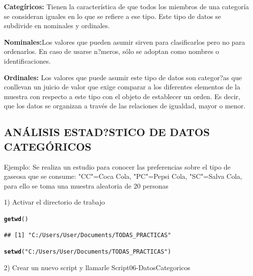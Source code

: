 \documentclass[12pt,letterpaper]{article}\usepackage[]{graphicx}\usepackage[]{color}
\makeatletter
\newcommand{\hlstr}[1]{\textcolor[rgb]{0.192,0.494,0.8}{#1}}%
\newcommand{\hlstd}[1]{\textcolor[rgb]{0.345,0.345,0.345}{#1}}%
\newcommand{\hlkwd}[1]{\textcolor[rgb]{0.737,0.353,0.396}{\textbf{#1}}}%
\newenvironment{kframe}{%
 \def\at@end@of@kframe{}%
 \ifinner\ifhmode%
  \def\at@end@of@kframe{\end{minipage}}%
  \begin{minipage}{\columnwidth}%
 \fi\fi%
 \def\FrameCommand##1{\hskip\@totalleftmargin \hskip-\fboxsep
 \colorbox{shadecolor}{##1}\hskip-\fboxsep
     \hskip-\linewidth \hskip-\@totalleftmargin \hskip\columnwidth}%
 \MakeFramed {\advance\hsize-\width
   \@totalleftmargin\z@ \linewidth\hsize
   \@setminipage}}%
 {\par\unskip\endMakeFramed%
 \at@end@of@kframe}
\newenvironment{knitrout}{}{} %
\makeatother
\begin{document}
\textbf{Categ\'iricos:} Tienen la caracter\'istica de que todos los miembros de una categor\'ia se consideran
iguales en lo que se refiere a ese tipo. Este tipo de datos se subdivide en nominales y ordinales.

\textbf{Nominales:}Los valores que pueden asumir sirven para clasificarlos pero no para
ordenarlos. En caso de usarse n?meros, s\'olo se adoptan como nombres o identificaciones.

\textbf{Ordinales:} Los valores que puede asumir este tipo de datos son categor?as que conllevan un juicio de valor que exige comparar a los diferentes elementos de la muestra con respecto a este tipo con el objeto de establecer un orden. Es decir, que los datos se organizan a trav\'es de las relaciones de igualdad, mayor o menor.

\subsection{AN\'ALISIS ESTAD?STICO DE DATOS CATEG\'ORICOS}  

Ejemplo: Se realiza un estudio para conocer las preferencias sobre el tipo de gaseosa que se
consume: "CC"=Coca Cola, "PC"=Pepsi Cola, "SC"=Salva Cola, para ello se toma una muestra
aleatoria de 20 personas

1) Activar el directorio de trabajo
\begin{knitrout}
\color{fgcolor}\begin{kframe}
\begin{alltt}
\hlkwd{getwd}\hlstd{()}
\end{alltt}
\begin{verbatim}
## [1] "C:/Users/User/Documents/TODAS_PRACTICAS"
\end{verbatim}
\begin{alltt}
\hlkwd{setwd}\hlstd{(}\hlstr{"C:/Users/User/Documents/TODAS_PRACTICAS"}\hlstd{)}
\end{alltt}
\end{kframe}
\end{knitrout}

2) Crear un nuevo script y llamarle Script06-DatosCategoricos
\end{document}
